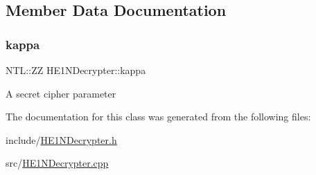 \subsection{Member Data Documentation}
\mbox{\label{classHE1NDecrypter_a409fafa4eaf8d73998d6fee08ce4a8e2}} 
\subsubsection{\texorpdfstring{kappa}{kappa}}
{\footnotesize\ttfamily N\+T\+L\+::\+ZZ H\+E1\+N\+Decrypter\+::kappa\hspace{0.3cm}{\ttfamily [private]}}

A secret cipher parameter 

The documentation for this class was generated from the following files\+:\begin{DoxyCompactItemize}
\item 
include/\hyperlink{HE1NDecrypter_8h}{H\+E1\+N\+Decrypter.\+h}\item 
src/\hyperlink{HE1NDecrypter_8cpp}{H\+E1\+N\+Decrypter.\+cpp}\end{DoxyCompactItemize}
